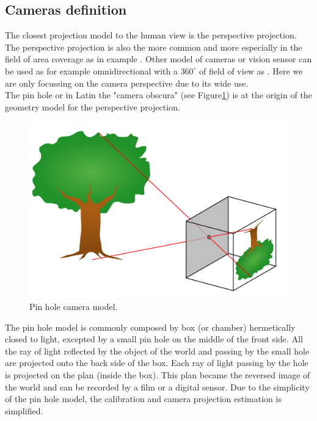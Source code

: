 \subsection{Cameras definition}\label{sec:CamerasDefinition}

The closest projection model to the human view is the perspective projection. The perspective projection is also the more common and more especially in the field of area coverage as in example \cite{101*topcuoglu2009,33*reddy2012,8*zhou2011,82*chrysostomou2012,22*zhao2008}. Other model of cameras or vision sensor can be used as for example omnidirectional with a $360^{\circ}$ of field of view as \citep{43*erdem2006,150*chakrabarty2002,174*zhang2016}. 
Here we are only focussing  on the camera perspective due to its wide use.  \\

The pin hole or in Latin the "camera obscura" (see Figure\ref{fig:cameraObscura}) is at the origin of the geometry model for the perspective projection.\\
\begin{figure}[t!]
\begin{center}
   \includegraphics[width=\linewidth]{img/PinholeCam.png}
  \caption{Pin hole camera model.}\label{fig:cameraObscura}
  \endminipage\hfill
\end{center}
\end{figure} 
 The pin hole model is commonly composed by box (or chamber) hermetically closed to light, excepted by a small pin hole on the middle of the front side. All the ray of light reflected by the object of the world and passing by the small hole are projected onto the back side of the box. Each ray of light passing by the hole is  projected on the plan (inside the box). This plan became the reversed image of the world and can be recorded by a film or a digital sensor. 
 Due to the simplicity of the pin hole model, the calibration and camera projection estimation is simplified.\\
  
